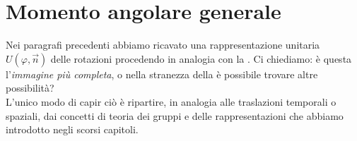 \documentclass[../../FisicaTeorica.tex]{subfiles}
\begin{document}

\section{Momento angolare generale}
Nei paragrafi precedenti abbiamo ricavato una rappresentazione unitaria $U(\varphi, \vec{n})$ delle rotazioni procedendo in analogia con la \MC. Ci chiediamo: è questa l'\textit{immagine più completa}, o nella stranezza della \MQ è possibile trovare altre possibilità?\\

L'unico modo di capir ciò è ripartire, in analogia alle traslazioni temporali o spaziali, dai concetti di teoria dei gruppi e delle rappresentazioni che abbiamo introdotto negli scorsi capitoli.\\
\end{document}
